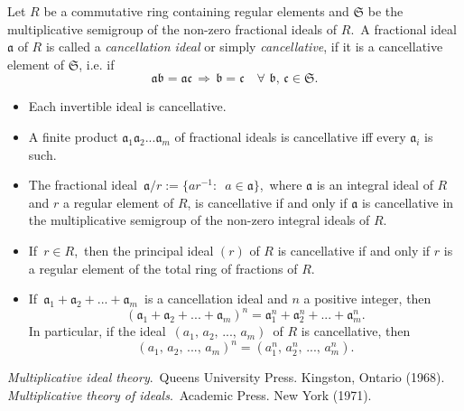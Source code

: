 \documentclass[12pt]{article}
\theoremstyle{definition}
\begin{document}
Let $R$ be a commutative ring containing regular elements and $\mathfrak{S}$ be the multiplicative semigroup of the non-zero fractional ideals of $R$.\, A fractional ideal $\mathfrak{a}$ of $R$ is called a {\em cancellation ideal} or simply {\em cancellative}, if it is a cancellative element of $\mathfrak{S}$, i.e. if 
$$\mathfrak{ab = ac}\, \Rightarrow\, \mathfrak{b = c}
\quad\forall\,\,\mathfrak{b,\,c}\in\mathfrak{S}.$$

\begin{itemize}
 \item Each invertible ideal is cancellative.
 \item A finite product $\mathfrak{a}_1\mathfrak{a}_2...\mathfrak{a}_m$ of fractional ideals is cancellative iff every $\mathfrak{a}_i$ is such.
 \item The fractional ideal\,  
$\mathfrak{a}/r := \{ar^{-1}\!:\,\,\,a\in\mathfrak{a}\}$,\, where $\mathfrak{a}$ is an integral ideal of $R$ and $r$ a regular element of $R$, is cancellative if and only if $\mathfrak{a}$ is cancellative in the multiplicative semigroup of the non-zero integral ideals of $R$.
 \item If\, $r\in R$,\, then the principal ideal $(r)$ of $R$ is cancellative if  and only if $r$ is a regular element of the total ring of fractions of $R$.
 \item If\, $\mathfrak{a}_1\!+\!\mathfrak{a}_2\!+\!...\!+\!\mathfrak{a}_m$\, is a cancellation ideal and $n$ a positive integer, then
     $$(\mathfrak{a}_1\!+\!\mathfrak{a}_2\!+\!...\!+\!\mathfrak{a}_m)^n =
      \mathfrak{a}_1^n\!+\!\mathfrak{a}_2^n\!+\!...\!+\!\mathfrak{a}_m^n.$$
In particular, if the ideal\, $(a_1,\,a_2,\,...,\,a_m)$\, of $R$ is cancellative, then
     $$(a_1,\,a_2,\,...,\,a_m)^n = (a_1^n,\,a_2^n,\,...,\,a_m^n).$$
\end{itemize}

\begin{thebibliography}{9}
  {\em Multiplicative ideal theory}.\, Queens University Press. Kingston, Ontario (1968).
  {\em Multiplicative theory of ideals}.\, Academic Press. New York (1971).
\end{thebibliography}
\end{document}
